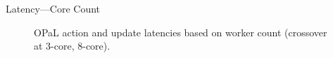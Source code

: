\documentclass[aspectratio=169,xcolor={dvipsnames}
]{beamer}
\newcommand{\approachshort}{OPaL}
\begin{document}
\begin{frame}{Latency---Core Count}
	\begin{figure}
		\centering
		\begin{subfigure}{0.49\linewidth}
		\end{subfigure}
		\begin{subfigure}{0.49\linewidth}
		\end{subfigure}
		\caption{\approachshort{} action and update latencies based on worker count (crossover at 3-core, 8-core).}
	\end{figure}
\end{frame}
\end{document}
